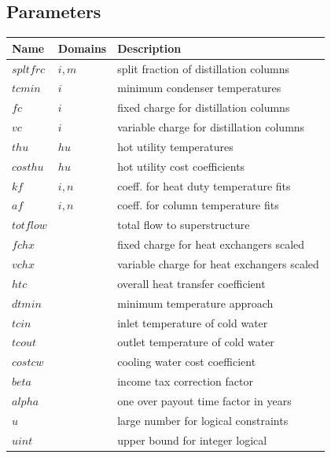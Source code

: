 \documentclass[11pt]{article}
\begin{document}
\subsection*{Parameters}
\begin{tabularx}{\textwidth}{| l | l | X |}
\hline
\textbf{Name} & \textbf{Domains} & \textbf{Description}\\
\hline
\endhead

$spltfrc$ & $i,m$ & split fraction of distillation columns\\
$tcmin$ & $i$ & minimum condenser temperatures\\
$fc$ & $i$ & fixed charge for distillation columns\\
$vc$ & $i$ & variable charge for distillation columns\\
$thu$ & $hu$ & hot utility temperatures\\
$costhu$ & $hu$ & hot utility cost coefficients\\
$kf$ & $i,n$ & coeff. for heat duty temperature fits\\
$af$ & $i,n$ & coeff. for column temperature fits\\
$totflow$ &  & total flow to superstructure\\
$fchx$ &  & fixed charge for heat exchangers scaled\\
$vchx$ &  & variable charge for heat exchangers scaled\\
$htc$ &  & overall heat transfer coefficient\\
$dtmin$ &  & minimum temperature approach\\
$tcin$ &  & inlet temperature of cold water\\
$tcout$ &  & outlet temperature of cold water\\
$costcw$ &  & cooling water cost coefficient\\
$beta$ &  & income tax correction factor\\
$alpha$ &  & one over payout time factor in years\\
$u$ &  & large number for logical constraints\\
$uint$ &  & upper bound for integer logical\\
\hline
\end{tabularx}
\end{document}
